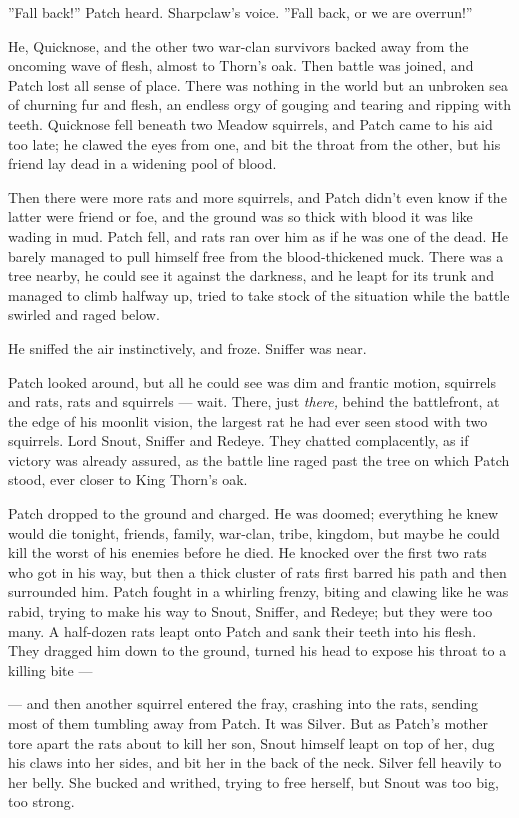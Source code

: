 \documentclass[12pt]{book}
\begin{document}
''Fall back!'' Patch heard. Sharpclaw's voice. ''Fall back, or we are overrun!''

He, Quicknose, and the other two war-clan survivors backed away from the oncoming wave of flesh, almost to Thorn's oak. Then battle was joined, and Patch lost all sense of place. There was nothing in the world but an unbroken sea of churning fur and flesh, an endless orgy of gouging and tearing and ripping with teeth. Quicknose fell beneath two Meadow squirrels, and Patch came to his aid too late; he clawed the eyes from one, and bit the throat from the other, but his friend lay dead in a widening pool of blood.

Then there were more rats and more squirrels, and Patch didn't even know if the latter were friend or foe, and the ground was so thick with blood it was like wading in mud. Patch fell, and rats ran over him as if he was one of the dead. He barely managed to pull himself free from the blood-thickened muck. There was a tree nearby, he could see it against the darkness, and he leapt for its trunk and managed to climb halfway up, tried to take stock of the situation while the battle swirled and raged below.

He sniffed the air instinctively, and froze. Sniffer was near.

Patch looked around, but all he could see was dim and frantic motion, squirrels and rats, rats and squirrels ---
wait. There, just {\it there,} behind the battlefront, at the edge of his moonlit vision, the largest rat he had ever seen stood with two squirrels. Lord Snout, Sniffer and Redeye. They chatted complacently, as if victory was already assured, as the battle line raged past the tree on which Patch stood, ever closer to King Thorn's oak.

Patch dropped to the ground and charged. He was doomed; everything he knew would die tonight, friends, family, war-clan, tribe, kingdom, but maybe he could kill the worst of his enemies before he died. He knocked over the first two rats who got in his way, but then a thick cluster of rats first barred his path and then surrounded him. Patch fought in a whirling frenzy, biting and clawing like he was rabid, trying to make his way to Snout, Sniffer, and Redeye; but they were too many. A half-dozen rats leapt onto Patch and sank their teeth into his flesh. They dragged him down to the ground, turned his head to expose his throat to a killing bite ---

---
and then another squirrel entered the fray, crashing into the rats, sending most of them tumbling away from Patch. It was Silver. But as Patch's mother tore apart the rats about to kill her son, Snout himself leapt on top of her, dug his claws into her sides, and bit her in the back of the neck. Silver fell heavily to her belly. She bucked and writhed, trying to free herself, but Snout was too big, too strong.
\end{document}
